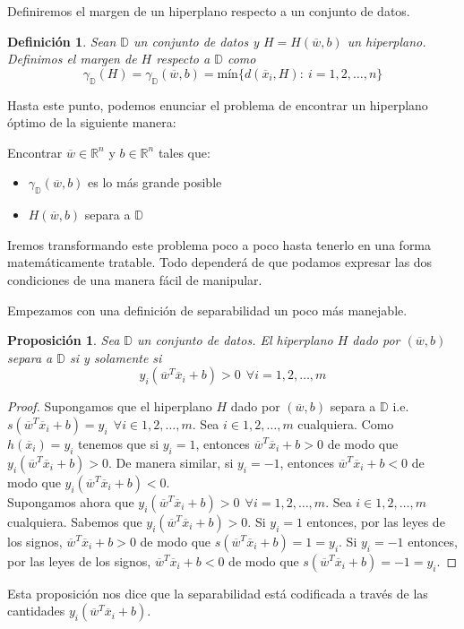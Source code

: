 \documentclass[11pt]{article}
\newtheorem{definition}{Definición}[section]
\newtheorem{proposition}{Proposición}[section]
\newcommand{\Rn}{\mathbb{R}^{n}}
\newcommand{\wv}{\overline{w}}
\newcommand{\x}{\overline{x}}
\newcommand{\Sn}{1,2,\ldots, n}
\newcommand{\Sm}{1,2,\ldots, m}
\newcommand{\Dat}{\mathbb{D}}
\begin{document}
Definiremos el margen de un hiperplano respecto a un conjunto de datos.
\begin{definition}
Sean $\Dat$ un conjunto de datos y $H=H(\wv, b)$ un hiperplano. Definimos el margen de $H$ respecto a $\Dat$ como
$$\gamma_{\Dat}(H)=\gamma_{\Dat}(\wv, b)=\text{mín}\{d(\x_{i}, H):\ i=\Sn\}$$
\end{definition}
Hasta este punto, podemos enunciar el problema de encontrar un hiperplano óptimo de la siguiente manera:
\begin{center}
Encontrar $\wv\in\Rn$ y $b\in\Rn$ tales que:\\
\begin{itemize}
\item $\gamma_{\Dat}(\wv, b)$ es lo más grande posible
\item $H(\wv, b)$ separa a $\Dat$\\
\end{itemize}
\end{center}

Iremos transformando este problema poco a poco hasta tenerlo en una forma matemáticamente tratable. Todo dependerá de que podamos expresar las dos condiciones de una manera fácil de manipular.

Empezamos con una definición de separabilidad un poco más manejable.
\begin{proposition}
Sea $\Dat$ un conjunto de datos. El hiperplano $H$ dado por $(\wv, b)$ separa a $\Dat$ si y solamente si
$$y_{i}(\wv ^{T}\x_{i}+b)>0\ \ \forall i=\Sm$$
\end{proposition}
\begin{proof}
Supongamos que el hiperplano $H$ dado por $(\wv, b)$ separa a $\Dat$ i.e. $s(\wv^{T}\x_{i}+b)=y_i\ \ \forall i\in\Sm$. Sea $i\in{1,2,\ldots,m}$ cualquiera. Como $h(\x_{i})= y_{i}$ tenemos que si $y_{i}=1$, entonces $\wv^{T}\x_{i}+b>0$ de modo que $y_{i}(\wv^{T}\x_{i}+b)>0$. De manera similar, si $y_{i}=-1$, entonces $\wv^{T}\x_{i}+b<0$ de modo que $y_{i}(\wv^{T}\x_{i}+b)<0$.\\
Supongamos ahora que $y_{i}(\wv ^{T}\x_{i}+b)>0\ \ \forall i=\Sm$. Sea $i\in{1,2,\ldots,m}$ cualquiera. Sabemos que $y_{i}(\wv ^{T}\x_{i}+b)>0$. Si $y_{i}=1$ entonces, por las leyes de los signos, $\wv ^{T}\x_{i}+b>0$ de modo que $s(\wv ^{T}\x_{i}+b)=1=y_{i}$. Si $y_{i}=-1$ entonces, por las leyes de los signos, $\wv ^{T}\x_{i}+b<0$ de modo que $s(\wv ^{T}\x_{i}+b)=-1=y_{i}$.
\end{proof}

Esta proposición nos dice que la separabilidad está codificada a través de las cantidades $y_{i}(\wv ^{T}\x_{i}+b)$.
\end{document}
